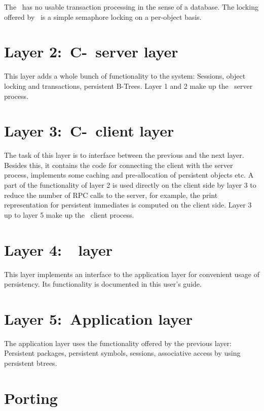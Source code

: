 The \postore\ has no usable transaction processing in the sense
of a database. The locking offered by \postore\ is a simple semaphore
locking on a per-object basis.

\section[C-PLOB server layer]%
{Layer 2:\ C-\protect\plob\ server layer}

This layer adds a whole bunch of functionality to the system:
Sessions, object locking and transactions, persistent B-Trees.
Layer 1 and 2 make up the \plob\ server process.

\section[C-PLOB client layer]%
{Layer 3:\ C-\protect\plob\ client layer}

The task of this layer is to interface between the previous and the
next layer. Besides this, it contains the code for connecting the
client with the server process, implements some caching and
pre-allocation of persistent objects etc.  A part of the functionality
of layer 2 is used directly on the client side by layer 3 to reduce
the number of RPC calls to the server, for example, the print
representation for persistent immediates is computed on the client
side. Layer 3 up to layer 5 make up the \plob\ client process.

\section[PLOB layer]%
{Layer 4:\ \protect\plob\ layer}

This layer implements an interface to the application layer for
convenient usage of persistency. Its functionality is documented in
this user's guide.

\section[Application layer]%
{Layer 5:\ Application layer}

The application layer uses the functionality offered by the previous
layer: Persistent packages, persistent symbols, sessions, associative
access by using persistent btrees.

\section[Porting PLOB]{Porting \protect\plob}

